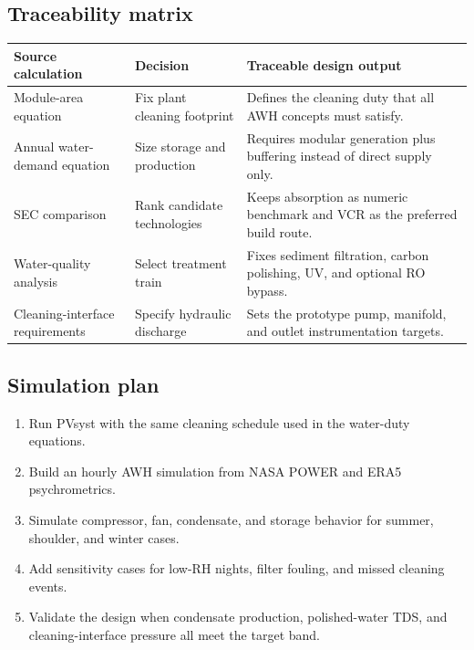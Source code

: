 \documentclass[11pt,a4paper]{article}
\begin{document}
\subsection{Traceability matrix}
\begin{table}[h]
\centering
\small
\begin{tabular}{@{}p{4.1cm}p{4.0cm}p{6.6cm}@{}}
\toprule
\textbf{Source calculation} & \textbf{Decision} & \textbf{Traceable design output} \\
\midrule
Module-area equation & Fix plant cleaning footprint & Defines the cleaning duty that all AWH concepts must satisfy. \\
Annual water-demand equation & Size storage and production & Requires modular generation plus buffering instead of direct supply only. \\
SEC comparison & Rank candidate technologies & Keeps absorption as numeric benchmark and VCR as the preferred build route. \\
Water-quality analysis & Select treatment train & Fixes sediment filtration, carbon polishing, UV, and optional RO bypass. \\
Cleaning-interface requirements & Specify hydraulic discharge & Sets the prototype pump, manifold, and outlet instrumentation targets. \\
\bottomrule
\end{tabular}
\end{table}

\subsection{Simulation plan}
\begin{enumerate}[leftmargin=*]
  \item Run PVsyst with the same cleaning schedule used in the water-duty equations.
  \item Build an hourly AWH simulation from NASA POWER and ERA5 psychrometrics.
  \item Simulate compressor, fan, condensate, and storage behavior for summer, shoulder, and winter cases.
  \item Add sensitivity cases for low-RH nights, filter fouling, and missed cleaning events.
  \item Validate the design when condensate production, polished-water TDS, and cleaning-interface pressure all meet the target band.
\end{enumerate}
\end{document}
